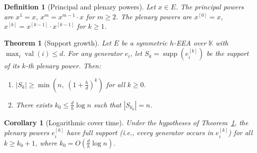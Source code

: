 \documentclass[10pt,a4paper]{amsart}
\newtheorem{definition}{Definition}
\newtheorem{theorem}{Theorem}
\newtheorem{corollary}{Corollary}
\newcommand{\EA}{E}          %
\newcommand{\K}{\mathbb{K}}
\DeclareMathOperator{\supp}{supp}
\DeclareMathOperator{\val}{val}
\begin{document}
\begin{definition}[Principal and plenary powers]\label{def:powers}
Let $x\in\EA$.  The \emph{principal powers} are $x^1=x$, $x^m=x^{m-1}\cdot x$ for
$m\ge 2$.  The \emph{plenary powers} are $x^{[0]}=x$, $x^{[k]}=
x^{[k-1]}\cdot x^{[k-1]}$ for $k\ge 1$.
\end{definition}

\begin{theorem}[Support growth]\label{thm:support-growth}
Let $\EA$ be a symmetric $h$-EEA over $\K$ with $\max_i\val(i)\le d$.
For any generator $e_i$, let $S_k=\supp(e_i^{[k]})$ be the support of
its $k$-th plenary power.  Then:
\begin{enumerate}[label=\normalfont(\roman*)]
  \item $|S_k|\ge\min\!\left(n,\; \left(1+\tfrac{h}{d}\right)^k\right)$
        for all $k\ge 0$.
  \item There exists $k_0\le\frac{d}{h}\log n$ such that
        $|S_{k_0}|=n$.
\end{enumerate}
\end{theorem}

\begin{corollary}[Logarithmic cover time]
\label{cor:cover-time}
Under the hypotheses of Theorem~\ref{thm:support-growth}, the plenary
powers $e_i^{[k]}$ have full support (i.e., every generator occurs in
$e_i^{[k]}$) for all $k\ge k_0+1$, where $k_0=O(\frac{d}{h}\log n)$.
\end{corollary}
\end{document}
